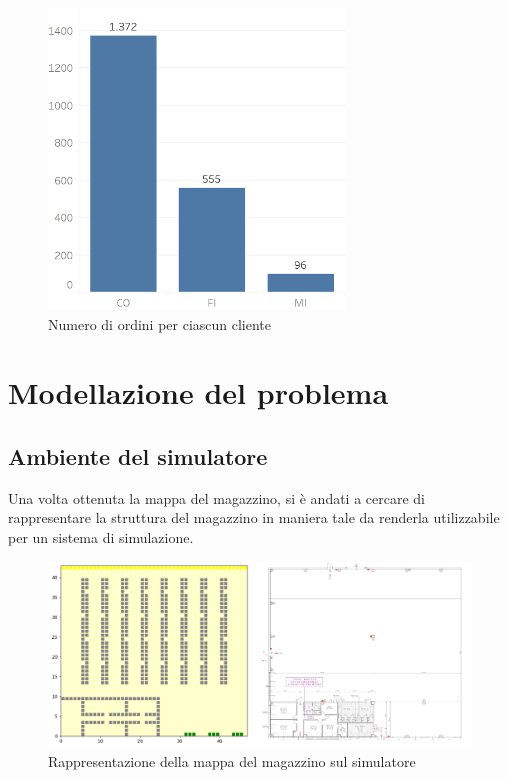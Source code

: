 \documentclass[12pt]{article}
\begin{document}
\begin{figure}[ht]
\centering
\includegraphics[width=0.7\textwidth,height=\textheight,keepaspectratio]{Figures/Initial_Dataset/Orders_client.png}
\caption[Numero di ordini per ciascun cliente]{Numero di ordini per ciascun cliente}
\label{fig:OrdiniClientiIniziali}
\end{figure}


\newpage
\section{Modellazione del problema}

\subsection{Ambiente del simulatore}
Una volta ottenuta la mappa del magazzino, si è andati a cercare di rappresentare la struttura del magazzino in maniera tale da renderla utilizzabile per un sistema di simulazione.
\begin{figure}[ht]
\includegraphics[width=\linewidth]{Figures/Graphics/Simulation_Domain.PNG}
\caption{Rappresentazione della mappa del magazzino sul simulatore}\label{fig:Rappresentazione_mappa}
\end{figure}
\end{document}
